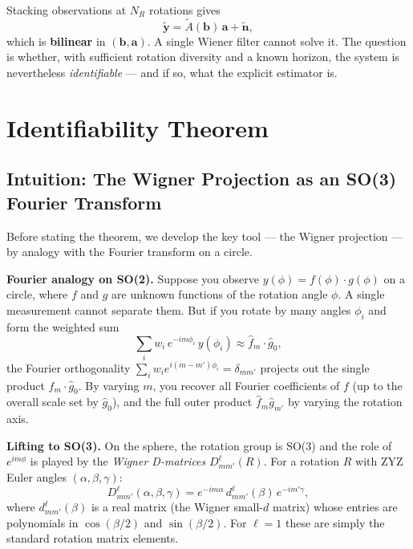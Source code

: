 \documentclass{aastex631}
\theoremstyle{plain}
\theoremstyle{remark}
\begin{document}
Stacking observations at $N_R$ rotations gives
\begin{equation}
  \tilde{\mathbf{y}} = \tilde{A}(\mathbf{b})\,\mathbf{a} + \tilde{\mathbf{n}},
\end{equation}
which is \textbf{bilinear} in $(\mathbf{b}, \mathbf{a})$.
A single Wiener filter cannot solve it.
The question is whether, with sufficient rotation diversity and a known
horizon, the system is nevertheless \emph{identifiable} --- and if so,
what the explicit estimator is.

\section{Identifiability Theorem} \label{sec:theorem}

\subsection{Intuition: The Wigner Projection as an SO(3) Fourier Transform}

Before stating the theorem, we develop the key tool --- the Wigner
projection --- by analogy with the Fourier transform on a circle.

\textbf{Fourier analogy on SO(2).}
Suppose you observe $y(\phi) = f(\phi) \cdot g(\phi)$ on a circle,
where $f$ and $g$ are unknown functions of the rotation angle $\phi$.
A single measurement cannot separate them.
But if you rotate by many angles $\phi_i$ and form the weighted sum
\begin{equation}
  \sum_i w_i\, e^{-im\phi_i}\, y(\phi_i) \approx \hat{f}_m \cdot \hat{g}_0,
\end{equation}
the Fourier orthogonality $\sum_i w_i e^{i(m-m')\phi_i} = \delta_{mm'}$
projects out the single product $\hat{f}_m \cdot \hat{g}_0$.
By varying $m$, you recover all Fourier coefficients of $f$ (up to the
overall scale set by $\hat{g}_0$), and the full outer product
$\hat{f}_m \hat{g}_{m'}$ by varying the rotation axis.

\textbf{Lifting to SO(3).}
On the sphere, the rotation group is SO(3) and the role of $e^{im\phi}$
is played by the \emph{Wigner D-matrices} $D^\ell_{mm'}(R)$.
For a rotation $R$ with ZYZ Euler angles $(\alpha, \beta, \gamma)$:
\begin{equation}
  D^\ell_{mm'}(\alpha, \beta, \gamma)
  = e^{-im\alpha}\, d^\ell_{mm'}(\beta)\, e^{-im'\gamma},
\end{equation}
where $d^\ell_{mm'}(\beta)$ is a real matrix (the Wigner small-$d$
matrix) whose entries are polynomials in $\cos(\beta/2)$ and
$\sin(\beta/2)$.
For $\ell=1$ these are simply the standard rotation matrix elements.
\end{document}
